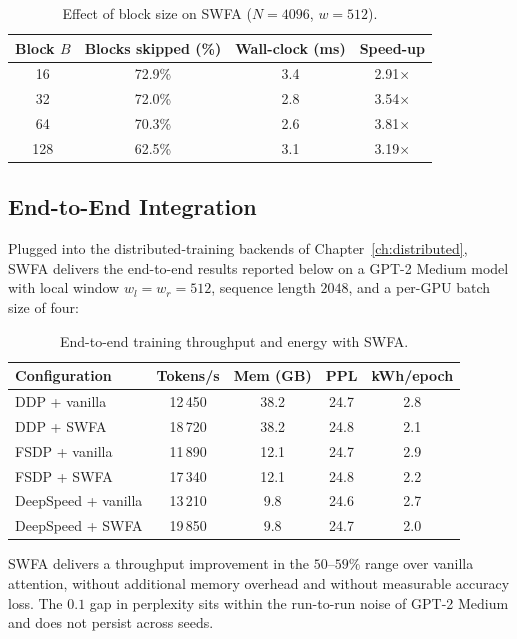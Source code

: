 \begin{table}[h]
\centering
\caption{Effect of block size on SWFA
         ($N{=}4096$, $w{=}512$).}
\label{tab:swfa_ablation}
\begin{tabular}{cccc}
\toprule
\textbf{Block $B$} & \textbf{Blocks skipped (\%)} & \textbf{Wall-clock (ms)} & \textbf{Speed-up} \\
\midrule
16  & 72.9\%  & 3.4 & 2.91$\times$ \\
32  & 72.0\%  & 2.8 & 3.54$\times$ \\
64  & 70.3\%  & 2.6 & 3.81$\times$ \\
128 & 62.5\%  & 3.1 & 3.19$\times$ \\
\bottomrule
\end{tabular}
\end{table}

\subsection{End-to-End Integration}\label{sec:swfa_e2e}
Plugged into the distributed-training backends of
Chapter~\ref{ch:distributed}, SWFA delivers the end-to-end
results reported below on a GPT-2 Medium model with local window
$w_l = w_r = 512$, sequence length $2048$, and a per-GPU batch
size of four:

\begin{table}[h]
\centering
\caption{End-to-end training throughput and energy with SWFA.}
\label{tab:e2e_performance}
\begin{tabular}{lcccc}
\toprule
\textbf{Configuration}          & \textbf{Tokens/s} & \textbf{Mem (GB)} & \textbf{PPL} & \textbf{kWh/epoch} \\
\midrule
DDP + vanilla                   & 12\,450 & 38.2 & 24.7 & 2.8 \\
DDP + SWFA                      & 18\,720 & 38.2 & 24.8 & 2.1 \\
FSDP + vanilla                  & 11\,890 & 12.1 & 24.7 & 2.9 \\
FSDP + SWFA                     & 17\,340 & 12.1 & 24.8 & 2.2 \\
DeepSpeed + vanilla             & 13\,210 &  9.8 & 24.6 & 2.7 \\
DeepSpeed + SWFA                & 19\,850 &  9.8 & 24.7 & 2.0 \\
\bottomrule
\end{tabular}
\end{table}

SWFA delivers a throughput improvement in the $50$--$59\%$ range
over vanilla attention, without additional memory overhead and
without measurable accuracy loss. The $0.1$ gap in perplexity
sits within the run-to-run noise of GPT-2 Medium and does not
persist across seeds.

